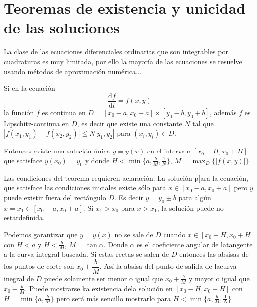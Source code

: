 \section{Teoremas de existencia y unicidad de las soluciones}

La clase de las ecuaciones diferenciales ordinarias que son integrables por cuadraturas es muy limitada, por ello la mayoría de las ecuaciones se resuelve usando métodos de aproximación numérica...


\begin{teorema}
Si en la ecuación
$$
\dfrac{\mathrm{d}f}{\mathrm{d}t}=f(x,y)
$$
la función $f$ es continua en $D=\left[x_0-a,x_0+a\right]\times\left[y_0-b,y_0+b\right]$, además $f$ es Lipschitz-continua en $D$, es decir que existe una constante $N$ tal que $|f(x_1,y_1)-f(x_2,y_2)|\leq N|y_1,y_2|$ para $(x_i,y_i)\in D$.

Entonces existe una solución única $y=\bar{y}(x)$ en el intervalo $\left[x_0-H,x_0+H\right]$ que satisface $y(x_0)=y_0$ y donde $H<\min\{a,\frac{b}{M},\frac{1}{N}\}$, $M=\max_{D}\{|f(x,y)|\} $
\end{teorema}


Las condiciones del teorema  requieren aclaración. La solución p[ara la ecuación, que satisface las condiciones iniciales  existe sólo para $x\in [x_0-a,x_0+a]$ pero $y$ puede existir fuera del rectángulo $D$. Es decir $y=y_0\pm b$ para algún $x=x_1\in[x_0-a,x_0+a]$. Si $x_1>x_0$ para $x>x_1$, la solución puede no estardefinida.

Podemos garantizar que $y=\bar{y}(x)$ no se sale de $D$ cuando $x\in[x_0-H,x_0+H]$ con $H<a$ y $H<\frac{b}{M}$, $M=\tan\alpha$. Donde $\alpha$ es el coeficiente angular de latangente a la curva integral buscada. Si estas rectas se salen de $D$ entonces las absisas de los puntos de corte son $x_0\pm\dfrac{b}{M}$. Así la absisa  del punto de salida de lacurva inegral de $D$ puede solamente ser menor o igual que $x_0+\frac{b}{M}$ y mayor o igual que $x_0-\frac{b}{M}$. Puede mostrarse ka existencia  dela solución en $[x_0-H,x_0+H]$ con $H=\min\{a,\frac{b}{M}\}$ pero será más sencillo mostrarlo para $H<\min\{a,\frac{b}{M},\frac{1}{N}\}$

\begin{figure}[H]
\centering
{}
    \caption{}
    \label{fig:my_label}
\end{figure}

